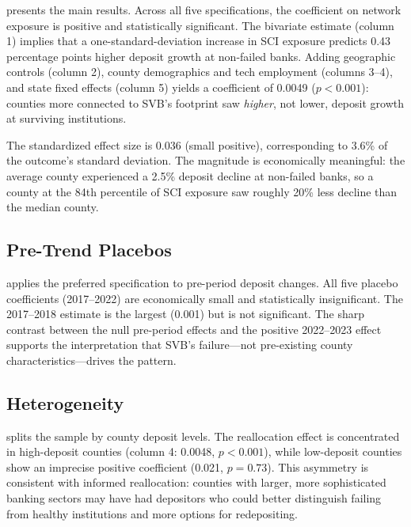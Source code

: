 \documentclass[12pt]{article}
\begin{document}
 presents the main results. Across all five specifications, the coefficient on network exposure is positive and statistically significant. The bivariate estimate (column 1) implies that a one-standard-deviation increase in SCI exposure predicts 0.43 percentage points higher deposit growth at non-failed banks. Adding geographic controls (column 2), county demographics and tech employment (columns 3--4), and state fixed effects (column 5) yields a coefficient of 0.0049 ($p < 0.001$): counties more connected to SVB's footprint saw \textit{higher}, not lower, deposit growth at surviving institutions.

The standardized effect size is 0.036 (small positive), corresponding to 3.6\% of the outcome's standard deviation. The magnitude is economically meaningful: the average county experienced a 2.5\% deposit decline at non-failed banks, so a county at the 84th percentile of SCI exposure saw roughly 20\% less decline than the median county.



\subsection{Pre-Trend Placebos}

 applies the preferred specification to pre-period deposit changes. All five placebo coefficients (2017--2022) are economically small and statistically insignificant. The 2017--2018 estimate is the largest (0.001) but is not significant. The sharp contrast between the null pre-period effects and the positive 2022--2023 effect supports the interpretation that SVB's failure---not pre-existing county characteristics---drives the pattern.



\subsection{Heterogeneity}

 splits the sample by county deposit levels. The reallocation effect is concentrated in high-deposit counties (column 4: 0.0048, $p < 0.001$), while low-deposit counties show an imprecise positive coefficient (0.021, $p = 0.73$). This asymmetry is consistent with informed reallocation: counties with larger, more sophisticated banking sectors may have had depositors who could better distinguish failing from healthy institutions and more options for redepositing.
\end{document}
